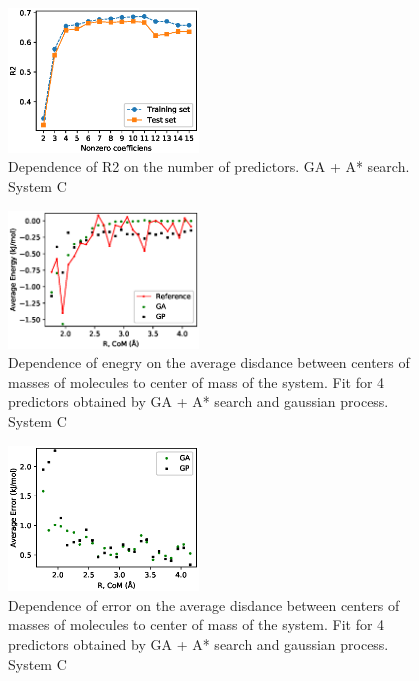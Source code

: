 \documentclass[aps,prl,reprint,amsmath,amssymb,nature]{revtex4-1}
\begin{document}
\begin{figure}
\includegraphics[width=0.45\textwidth]{media/C_GA_PATH_R2.eps}
\caption{Dependence of R2 on the number of predictors. GA + A* search. System C}\label{Fig:C_R2}
\end{figure}

\begin{figure}
\includegraphics[width=0.45\textwidth]{media/C_Energy_4_predictors.eps}
\caption{Dependence of enegry on the average disdance between centers of masses of molecules to center of mass of the system. Fit for 4 predictors obtained by GA + A* search and gaussian process. System C}\label{Fig:C_Energy_4_predictors}
\end{figure}

\begin{figure}
\includegraphics[width=0.45\textwidth]{media/C_Error_4_predictors.eps}
\caption{Dependence of error on the average disdance between centers of masses of molecules to center of mass of the system. Fit for 4 predictors obtained by GA + A* search and gaussian process. System C}\label{Fig:C_RMSE_4_predictors}
\end{figure}
\end{document}
